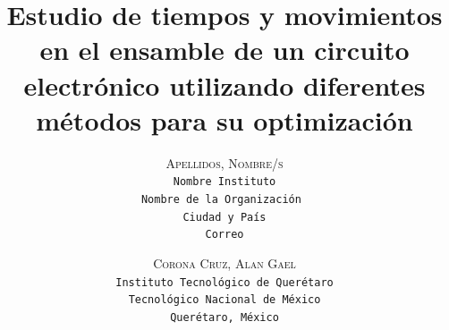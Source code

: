     \lfoot{ \thepage}
    
    \setlength{\droptitle}{-5\baselineskip} %
    \title{\textbf{Estudio de tiempos y movimientos en el ensamble de un circuito electrónico utilizando diferentes métodos para su optimización }} %
    
     \author{ 
     \textsc{Apellidos, Nombre/s}\\ 
     \texttt{ Nombre Instituto } \\ 
     \texttt{Nombre de la Organización } \\ 
     \texttt{Ciudad y País}\\ 
     \texttt{Correo} 
     \and 
     \textsc{Corona Cruz, Alan Gael}\\ 
     \texttt{ Instituto Tecnológico de Querétaro } \\ 
     \texttt{ Tecnológico Nacional de México } \\ 
     \texttt{Querétaro, México}\\ 
     \texttt{} 
    }
    
    
    
    
    \maketitle
    \thispagestyle{fancy}
    
